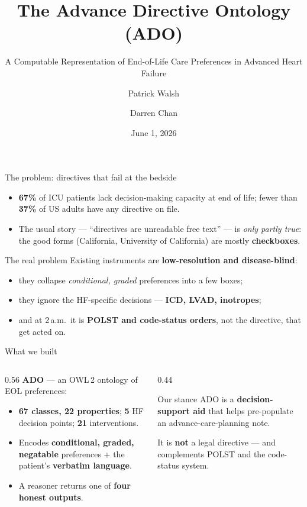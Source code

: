 \documentclass[aspectratio=169,10pt]{beamer}
\title[ADO]{The Advance Directive Ontology (ADO)}
\subtitle{A Computable Representation of End-of-Life Care Preferences in Advanced Heart Failure}
\author[Walsh \& Chan]{Patrick Walsh \and Darren Chan}
\institute[Stanford]{Stanford University \quad | \quad BMDS 210 / CS 270}
\date{June 1, 2026}
\newcommand{\hl}[1]{\textcolor{adoblue}{\textbf{#1}}}
\begin{document}
\begin{frame}[plain]
  \titlepage
\end{frame}

\begin{frame}{The problem: directives that fail at the bedside}
  \begin{itemize}
    \item \textbf{67\%} of ICU patients lack decision-making capacity at end of life; fewer than \textbf{37\%} of US adults have any directive on file.
    \item The usual story --- ``directives are unreadable free text'' --- is \emph{only partly true}: the good forms (California, University of California) are mostly \hl{checkboxes}.
  \end{itemize}
  \vspace{0.4em}
  \begin{block}{The real problem}
    Existing instruments are \hl{low-resolution and disease-blind}:
    \begin{itemize}
      \item they collapse \emph{conditional, graded} preferences into a few boxes;
      \item they ignore the HF-specific decisions --- \textbf{ICD, LVAD, inotropes};
      \item and at 2\,a.m.\ it is \hl{POLST and code-status orders}, not the directive, that get acted on.
    \end{itemize}
  \end{block}
\end{frame}

\begin{frame}{What we built}
  \begin{columns}[T]
    \begin{column}{0.56\textwidth}
      \textbf{ADO} --- an OWL\,2 ontology of EOL preferences:
      \begin{itemize}
        \item \textbf{67 classes, 22 properties}; \textbf{5} HF decision points; \textbf{21} interventions.
        \item Encodes \hl{conditional, graded, negatable} preferences + the patient's \hl{verbatim language}.
        \item A reasoner returns one of \hl{four honest outputs}.
      \end{itemize}
    \end{column}
    \begin{column}{0.44\textwidth}
      \begin{block}{Our stance}
        ADO is a \hl{decision-support aid} that helps pre-populate an advance-care-planning note.
        \medskip

        It is \textbf{not} a legal directive --- and complements POLST and the code-status system.
      \end{block}
    \end{column}
  \end{columns}
\end{frame}
\end{document}
